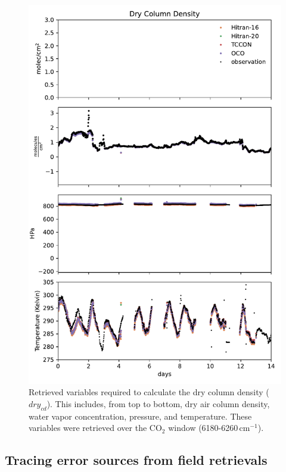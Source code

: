 \documentclass[amt, manuscript]{copernicus}
\begin{document}
\begin{figure}
  \centering
  \includegraphics{vcd_timeseries.pdf}
  \caption{Retrieved variables required to calculate the dry column density ($dry_{cd}$). This includes, from top to bottom, dry air column density, water vapor concentration, pressure, and temperature. These variables were retrieved over the CO$_2$ window (6180-6260\,cm$^{-1}$).}
  \label{fig:vcd_timeseries}
\end{figure}

\subsection{Tracing error sources from field retrievals}
\end{document}
